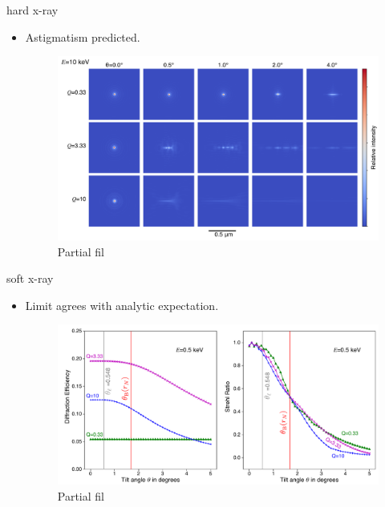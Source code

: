 \documentclass{beamer}
\begin{document}
\begin{frame}{hard x-ray}
	\begin{itemize}
		\item Astigmatism predicted.
		\begin{center}
			\begin{figure}
				\includegraphics[scale=0.275]{foc_spot_ten}
				\caption{Partial fil}	
			\end{figure}
		\end{center}
	\end{itemize}
\end{frame}

\begin{frame}{soft x-ray}
	\begin{itemize}
		\item Limit agrees with analytic expectation.
		\begin{center}
			\begin{figure}
				\includegraphics[scale=0.275]{tilt_plot_half}
				\caption{Partial fil}	
			\end{figure}
		\end{center}
	\end{itemize}
\end{frame}
\end{document}
